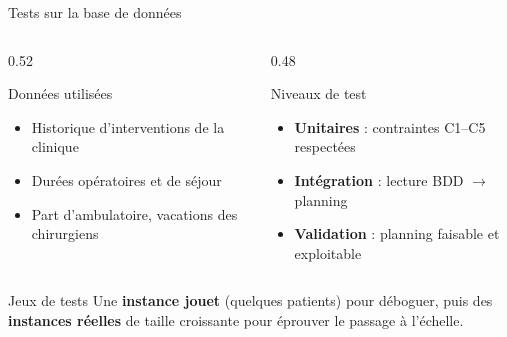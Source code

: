\documentclass[aspectratio=169,11pt]{beamer}
\begin{document}
\begin{frame}{Tests sur la base de données}
  \small
  \begin{columns}[T]
    \begin{column}{0.52\textwidth}
      \begin{block}{Données utilisées}
        \begin{itemize}
          \item Historique d'interventions de la clinique
          \item Durées opératoires et de séjour
          \item Part d'ambulatoire, vacations des chirurgiens
        \end{itemize}
      \end{block}
    \end{column}
    \begin{column}{0.48\textwidth}
      \begin{block}{Niveaux de test}
        \begin{itemize}
          \item \textbf{Unitaires} : contraintes C1--C5 respectées
          \item \textbf{Intégration} : lecture BDD $\rightarrow$ planning
          \item \textbf{Validation} : planning faisable et exploitable
        \end{itemize}
      \end{block}
    \end{column}
  \end{columns}
  \vspace{0.3em}
  \begin{exampleblock}{\footnotesize Jeux de tests}
    \footnotesize Une \textbf{instance jouet} (quelques patients) pour
    déboguer, puis des \textbf{instances réelles} de taille croissante pour
    éprouver le passage à l'échelle.
  \end{exampleblock}
\end{frame}
\end{document}

